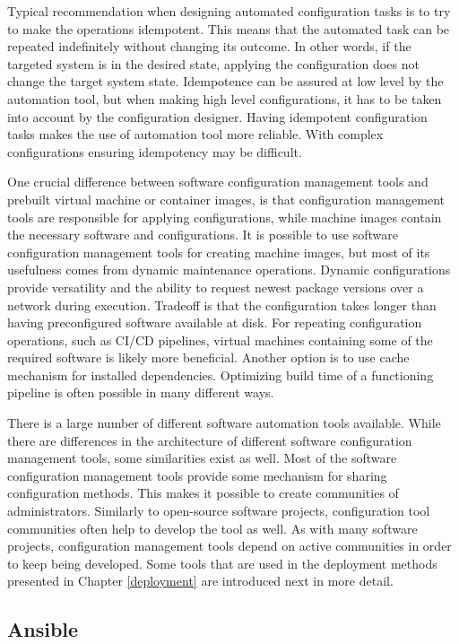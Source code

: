 Typical recommendation when designing automated configuration tasks is to try
to make the operations idempotent. This means that the automated task can be
repeated indefinitely without changing its outcome. In other words, if the
targeted system is in the desired state, applying the configuration does not
change the target system state. Idempotence can be assured at low level by the
automation tool, but when making high level configurations, it has to be taken
into account by the configuration designer. Having idempotent configuration
tasks makes the use of automation tool more reliable. With complex
configurations ensuring idempotency may be difficult.

One crucial difference between software configuration management tools and
prebuilt virtual machine or container images, is that configuration management
tools are responsible for applying configurations, while machine images contain
the necessary software and configurations. It is possible to use software
configuration management tools for creating machine images, but most of its
usefulness comes from dynamic maintenance operations. Dynamic configurations
provide versatility and the ability to request newest package versions over a
network during execution. Tradeoff is that the configuration takes longer than
having preconfigured software available at disk. For repeating configuration
operations, such as CI/CD pipelines, virtual machines containing some of the
required software is likely more beneficial. Another option is to use cache
mechanism for installed dependencies. Optimizing build time of a functioning
pipeline is often possible in many different ways.

There is a large number of different software automation tools available. While
there are differences in the architecture of different software configuration
management tools, some similarities exist as well. Most of the software
configuration management tools provide some mechanism for sharing configuration
methods. This makes it possible to create communities of administrators.
Similarly to open-source software projects, configuration tool communities
often help to develop the tool as well. As with many software projects,
configuration management tools depend on active communities in order to keep
being developed. Some tools that are used in the deployment methods presented
in Chapter \ref{deployment} are introduced next in more detail.

\subsection{Ansible}

